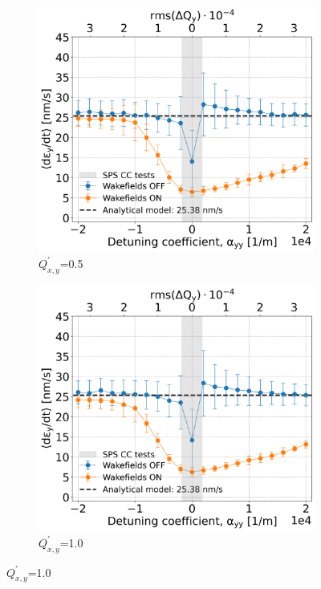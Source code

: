 \begin{figure}[htp]
\begin{subfigure}{.45\textwidth}
        \includegraphics[width=.95\linewidth]{images/Ch7/deyRates_final_2018_PN_sps_270GeV_PN1e-8_400MHz_y-plane_QpxQpy5e-1_6D_Nb5e5_intensity3e10_ayyScan_wakesON_vs_OFF_vs_TuneSpreadvsExpectedSPS.png}
        \caption{$Q^\prime_{x,y}$=0.5}
        \label{fig:study_6_chroma_scan_Qpxy5e-1}
    \end{subfigure}
    \begin{subfigure}{.45\textwidth}
        \centering
        \includegraphics[width=.95\linewidth]{images/Ch7/Qpx1.png}  
        \caption{$Q^\prime_{x,y}$=1.0}

\end{subfigure}
\end{figure}
